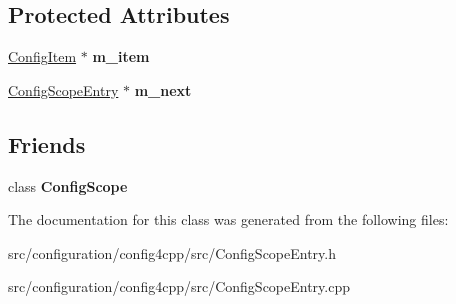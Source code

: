 \subsection*{Protected Attributes}
\begin{DoxyCompactItemize}
\item 
\hypertarget{classCONFIG4CPP__NAMESPACE_1_1ConfigScopeEntry_abb94dfbf5f2fde6c8ee495dd5a1b401e}{\hyperlink{classCONFIG4CPP__NAMESPACE_1_1ConfigItem}{Config\-Item} $\ast$ {\bfseries m\-\_\-item}}\label{classCONFIG4CPP__NAMESPACE_1_1ConfigScopeEntry_abb94dfbf5f2fde6c8ee495dd5a1b401e}

\item 
\hypertarget{classCONFIG4CPP__NAMESPACE_1_1ConfigScopeEntry_aedd353b34835ec0394f34c90f6d15fc4}{\hyperlink{classCONFIG4CPP__NAMESPACE_1_1ConfigScopeEntry}{Config\-Scope\-Entry} $\ast$ {\bfseries m\-\_\-next}}\label{classCONFIG4CPP__NAMESPACE_1_1ConfigScopeEntry_aedd353b34835ec0394f34c90f6d15fc4}

\end{DoxyCompactItemize}
\subsection*{Friends}
\begin{DoxyCompactItemize}
\item 
\hypertarget{classCONFIG4CPP__NAMESPACE_1_1ConfigScopeEntry_a94c03e20ed1c4b9e85f896ef02629810}{class {\bfseries Config\-Scope}}\label{classCONFIG4CPP__NAMESPACE_1_1ConfigScopeEntry_a94c03e20ed1c4b9e85f896ef02629810}

\end{DoxyCompactItemize}


The documentation for this class was generated from the following files\-:\begin{DoxyCompactItemize}
\item 
src/configuration/config4cpp/src/Config\-Scope\-Entry.\-h\item 
src/configuration/config4cpp/src/Config\-Scope\-Entry.\-cpp\end{DoxyCompactItemize}
